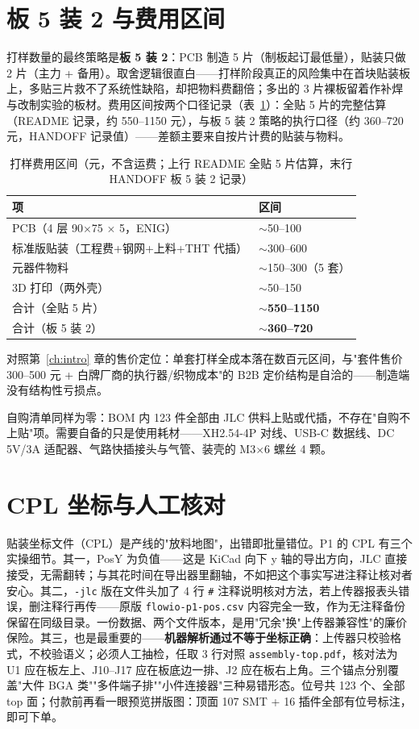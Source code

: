 \section{板 5 装 2 与费用区间}
\label{sec:fab-cost}

打样数量的最终策略是\textbf{板 5 装 2}：PCB 制造 5 片（制板起订最低量），贴装只做 2 片（主力 + 备用）。取舍逻辑很直白——打样阶段真正的风险集中在首块贴装板上，多贴三片救不了系统性缺陷，却把物料费翻倍；多出的 3 片裸板留着作补焊与改制实验的板材。费用区间按两个口径记录（表~\ref{tab:fab-cost}）：全贴 5 片的完整估算（README 记录，约 550--1150 元），与板 5 装 2 策略的执行口径（约 360--720 元，HANDOFF 记录值）——差额主要来自按片计费的贴装与物料。

\begin{table}[htbp]
  \centering
  \caption{打样费用区间（元，不含运费；上行 README 全贴 5 片估算，末行 HANDOFF 板 5 装 2 记录）}
  \label{tab:fab-cost}
  \begin{tabular}{ll}
    \toprule
    项 & 区间 \\
    \midrule
    PCB（4 层 90$\times$75 $\times$ 5，ENIG） & $\sim$50--100 \\
    标准版贴装（工程费+钢网+上料+THT 代插） & $\sim$300--600 \\
    元器件物料 & $\sim$150--300（5 套） \\
    3D 打印（两外壳） & $\sim$50--150 \\
    \midrule
    合计（全贴 5 片） & \textbf{$\sim$550--1150} \\
    合计（板 5 装 2） & \textbf{$\sim$360--720} \\
    \bottomrule
  \end{tabular}
\end{table}

对照第~\ref{ch:intro} 章的售价定位：单套打样全成本落在数百元区间，与"套件售价 300--500 元 + 白牌厂商的执行器/织物成本"的 B2B 定价结构是自洽的——制造端没有结构性亏损点。

自购清单同样为零：BOM 内 123 件全部由 JLC 供料上贴或代插，不存在"自购不上贴"项。需要自备的只是使用耗材——XH2.54-4P 对线、USB-C 数据线、DC 5V/3A 适配器、气路快插接头与气管、装壳的 M3$\times$6 螺丝 4 颗。

\section{CPL 坐标与人工核对}
\label{sec:fab-cpl}

贴装坐标文件（CPL）是产线的"放料地图"，出错即批量错位。P1 的 CPL 有三个实操细节。其一，PosY 为负值——这是 KiCad 向下 y 轴的导出方向，JLC 直接接受，无需翻转；与其花时间在导出器里翻轴，不如把这个事实写进注释让核对者安心。其二，\texttt{-jlc} 版在文件头加了 4 行 \texttt{\#} 注释说明核对方法，若上传器报表头错误，删注释行再传——原版 \texttt{flowio-p1-pos.csv} 内容完全一致，作为无注释备份保留在同级目录。一份数据、两个文件版本，是用"冗余"换"上传器兼容性"的廉价保险。其三，也是最重要的——\textbf{机器解析通过不等于坐标正确}：上传器只校验格式，不校验语义；必须人工抽检，任取 3 行对照 \texttt{assembly-top.pdf}，核对法为 U1 应在板左上、J10--J17 应在板底边一排、J2 应在板右上角。三个锚点分别覆盖"大件 BGA 类""多件端子排""小件连接器"三种易错形态。位号共 123 个、全部 top 面；付款前再看一眼预览拼版图：顶面 107 SMT + 16 插件全部有位号标注，即可下单。

